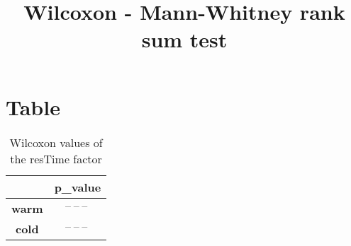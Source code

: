 \documentclass{article}
\title{Wilcoxon - Mann-Whitney rank sum test}
\author{}
\begin{document}
\maketitle
\section{Table}
\begin{table}[!htp]
  \caption{Wilcoxon values of the resTime factor}
  \label{table:resTime}
  \centering
  \begin{scriptsize}
  \begin{tabular}{c|c}
      & \textbf{p\_value} \\\hline
      \textbf{warm} & $\text{--}\ \text{--}\ \text{--}\ $ \\
      \textbf{cold} & $\text{--}\ \text{--}\ \text{--}\ $ \\
  \end{tabular}
  \end{scriptsize}
\end{table}
\end{document}

